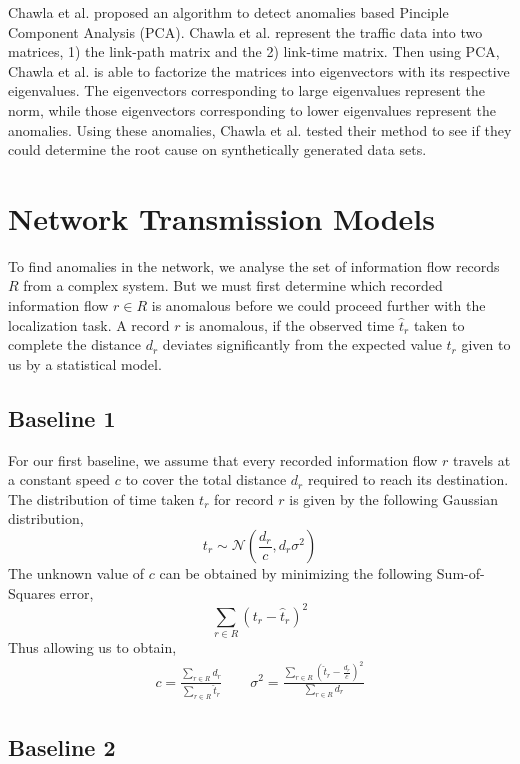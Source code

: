 \documentclass{sig-alternate}
\begin{document}
Chawla et al. \cite{Chawla2012} proposed an algorithm to detect anomalies based Pinciple Component Analysis (PCA). Chawla et al. \cite{Chawla2012} represent the traffic data into two matrices, 1) the link-path matrix and the 2) link-time matrix. Then using PCA, Chawla et al. \cite{Chawla2012} is able to factorize the matrices into eigenvectors with its respective eigenvalues. The eigenvectors corresponding to large eigenvalues represent the norm, while those eigenvectors corresponding to lower eigenvalues represent the anomalies. Using these anomalies, Chawla et al. \cite{Chawla2012} tested their method to see if they could determine the root cause on synthetically generated data sets.

\section{Network Transmission Models}
\label{sec:models}

To find anomalies in the network, we analyse the set of information flow records $R$ from a complex system. But we must first determine which recorded information flow $r \in R$ is anomalous before we could proceed further with the localization task. A record $r$ is anomalous, if the observed time $\hat{t}_r$ taken to complete the distance $d_r$ deviates significantly from the expected value $t_r$ given to us by a statistical model.

\subsection{Baseline 1}

For our first baseline, we assume that every recorded information flow $r$ travels at a constant speed $c$ to cover the total distance $d_r$ required to reach its destination. The distribution of time taken $t_r$ for record $r$ is given by the following Gaussian distribution,
\[ t_r \sim \mathcal{N} \left( \frac{d_r}{c}, d_r \sigma^2 \right) \]
The unknown value of $c$ can be obtained by minimizing the following Sum-of-Squares error,
\[ \sum_{r \in R} (t_r - \hat{t}_r)^2 \]
Thus allowing us to obtain,
\begin{gather*}
	c = \frac{\sum_{r \in R} d_r}{\sum_{r \in R} \hat{t}_r} \qquad
    \sigma^2 = \frac{ \sum_{r \in R} \left( \hat{t}_r - \frac{d_r}{c} \right)^2 }{ \sum_{r \in R} d_r }
\end{gather*}

\subsection{Baseline 2}
\end{document}
